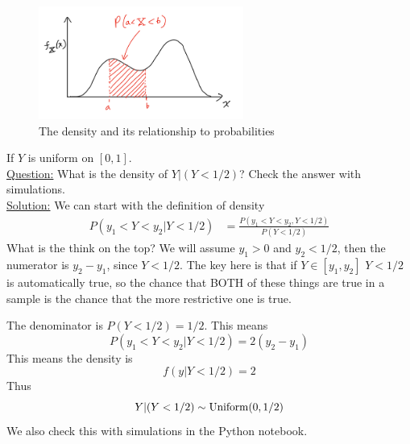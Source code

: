 \begin{itemize}
\begin{figure}[h]
\centering
\includegraphics[width=0.6\textwidth]{./../figures/density}
\caption{The density and its relationship to probabilities}\label{fig:density}
\end{figure}



\begin{example}
If $Y$ is uniform on $[0,1]$. \\


\noindent
\underline{Question:}  What is the density of $Y|(Y<1/2)$? Check the answer with simulations.\\

 \noindent
\underline{Solution:} We can start with the definition of density
\begin{align*}
P(y_1<Y<y_2|Y<1/2) &= \frac{P(y_1<Y<y_2,Y<1/2)}{P(Y<1/2)}
\end{align*}
What is the think on the top? We will assume $y_1>0$ and $y_2<1/2$, then the numerator is $y_2-y_1$, since $Y<1/2$. The key here is that if $Y \in [y_1,y_2]$ $Y<1/2$ is automatically true, so the chance that BOTH of these things are true in a sample is the chance that the more restrictive one is true.

The denominator is $P(Y<1/2) = 1/2$. This means
\begin{equation*}
P(y_1<Y<y_2|Y<1/2) = 2(y_2-y_1)
\end{equation*}
This means the density is
\begin{equation*}
f(y|Y<1/2) = 2
\end{equation*}
Thus
\begin{equation*}
Y|(Y<1/2) \sim {\rm Uniform}(0,1/2)
\end{equation*}
We also check this with simulations in the Python notebook. 
\end{example}

%
%
%


\end{itemize}
